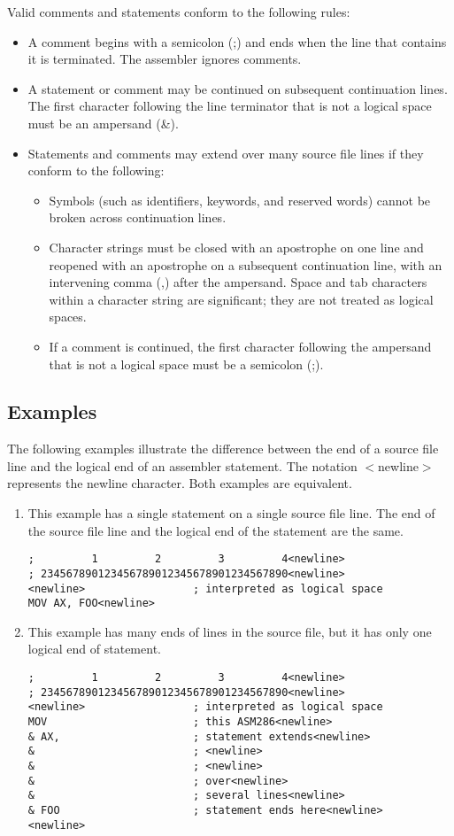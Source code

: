 Valid comments and statements conform to the following rules:
\begin{itemize}
\item A comment begins with a semicolon (;) and ends when the line that contains it is terminated. The assembler ignores comments.
\item A statement or comment may be continued on subsequent continuation lines. The first character following the line terminator that is not a logical space must be an ampersand (\&).
\item Statements and comments may extend over many source file lines if they conform to the following:
\begin{itemize}
\item Symbols (such as identifiers, keywords, and reserved words) cannot be broken across continuation lines.
\item Character strings must be closed with an apostrophe on one line and reopened with an apostrophe on a subsequent continuation line, with an intervening comma (,) after the ampersand. Space and tab characters within a character string are significant; they are not treated as logical spaces.
\item If a comment is continued, the first character following the ampersand that is not a logical space must be a semicolon (;).
\end{itemize}
\end{itemize}

\subsection*{Examples}
The following examples illustrate the difference between the end of a source file line and the logical end of an assembler statement. The notation $<$newline$>$ represents the newline character. Both examples are equivalent.
\begin{enumerate}
\item This example has a single statement on a single source file line. The end of the source file line and the logical end of the statement are the same.
\begin{verbatim}
;         1         2         3         4<newline>
; 234567890123456789012345678901234567890<newline>
<newline>                 ; interpreted as logical space 
MOV AX, FOO<newline>
\end{verbatim}
\item This example has many ends of lines in the source file, but it has only one logical end of statement.
\begin{verbatim}
;         1         2         3         4<newline>
; 234567890123456789012345678901234567890<newline>
<newline>                 ; interpreted as logical space 
MOV                       ; this ASM286<newline>
& AX,                     ; statement extends<newline>
&                         ; <newline>
&                         ; <newline>
&                         ; over<newline>
&                         ; several lines<newline>
& FOO                     ; statement ends here<newline>
<newline> 
\end{verbatim}
\end{enumerate}
